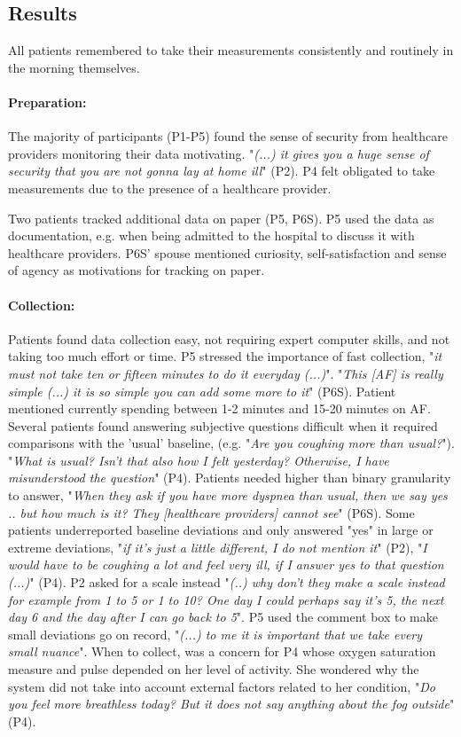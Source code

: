 \subsection{Results}
All patients remembered to take their measurements consistently and routinely in the morning themselves.

\paragraph{Preparation:} 
The majority of participants (P1-P5) found the sense of security from healthcare providers monitoring their data motivating. "\textit{(...) it gives you a huge sense of security that you are not gonna lay at home ill}" (P2). P4 felt obligated to take measurements due to the presence of a healthcare provider. 

Two patients tracked additional data on paper (P5, P6S). P5 used the data as documentation, e.g. when being admitted to the hospital to discuss it with healthcare providers. P6S' spouse mentioned curiosity, self-satisfaction and sense of agency as motivations for tracking on paper. 

\paragraph{Collection:} 
Patients found data collection easy, not requiring expert computer skills, and not taking too much effort or time. P5 stressed the importance of fast collection, "\textit{it must not take ten or fifteen minutes to do it everyday (...)}". "\textit{This [AF] is really simple (...) it is so simple you can add some more to it}" (P6S). Patient mentioned currently spending between 1-2 minutes and 15-20 minutes on AF. Several patients found answering subjective questions difficult when it required comparisons with the 'usual' baseline, (e.g. "\textit{Are you coughing more than usual?}"). "\textit{What is usual? Isn't that also how I felt yesterday? Otherwise, I have misunderstood the question}" (P4). Patients needed higher than binary granularity to answer, "\textit{When they ask if you have more dyspnea than usual, then we say yes .. but how much is it? They [healthcare providers] cannot see}" (P6S). Some patients underreported baseline deviations and only answered "yes" in large or extreme deviations, "\textit{if it's just a little different, I do not mention it}" (P2),  "\textit {I would have to be coughing a lot and feel very ill, if I answer yes to that question (...)}" (P4). P2 asked for a scale instead "\textit{(..) why don't they make a scale instead for example from 1 to 5 or 1 to 10? One day I could perhaps say it's 5, the next day 6 and the day after I can go back to 5}". P5 used the comment box to make small deviations go on record, "\textit{(...) to me it is important that we take every small nuance}".  When to collect, was a concern for P4 whose oxygen saturation measure and pulse depended on her level of activity. She wondered why the system did not take into account external factors related to her condition, "\textit{Do you feel more breathless today? But it does not say anything about the fog outside}" (P4). 

